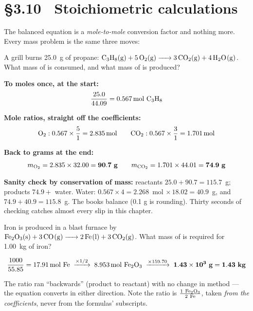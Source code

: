 \documentclass{apchem-worksheet}
\begin{document}
\section*{\sffamily \S3.10 \textbullet\ Stoichiometric calculations}

The balanced equation is a \emph{mole-to-mole} conversion factor and
nothing more. Every mass problem is the same three moves:

\begin{center}
\end{center}

\begin{workedexample}
A grill burns \SI{25.0}{\gram} of propane:
$\ce{C3H8(g) + 5O2(g) -> 3CO2(g) + 4H2O(g)}$.
What mass of  is consumed, and what mass of  is produced?

\textbf{To moles once, at the start:}
\[ \frac{25.0}{44.09} = \SI{0.567}{\mole}~\ce{C3H8} \]

\textbf{Mole ratios, straight off the coefficients:}
\[ \ce{O2}: 0.567 \times \frac{5}{1} = \SI{2.835}{\mole} \qquad
   \ce{CO2}: 0.567 \times \frac{3}{1} = \SI{1.701}{\mole} \]

\textbf{Back to grams at the end:}
\[ m_{\ce{O2}} = 2.835 \times 32.00 = \mathbf{90.7~g} \qquad
   m_{\ce{CO2}} = 1.701 \times 44.01 = \mathbf{74.9~g} \]

\textbf{Sanity check by conservation of mass:} reactants
$25.0 + 90.7 = 115.7$~g; products $74.9 + $ water. Water:
$0.567 \times 4 = 2.268$~mol $\times\, 18.02 = 40.9$~g, and
$74.9 + 40.9 = 115.8$~g. The books balance (0.1 g is rounding). Thirty
seconds of checking catches almost every slip in this chapter.
\end{workedexample}

\begin{workedexample}
Iron is produced in a blast furnace by
$\ce{Fe2O3(s) + 3CO(g) -> 2Fe(l) + 3CO2(g)}$.
What mass of  is required for \SI{1.00}{\kilo\gram} of iron?

\[ \frac{1000}{55.85} = \SI{17.91}{\mole}~\ce{Fe}
   \;\xrightarrow{\times 1/2}\; \SI{8.953}{\mole}~\ce{Fe2O3}
   \;\xrightarrow{\times 159.70}\; \mathbf{1.43\times10^{3}~g}
   = \mathbf{1.43~kg} \]

The ratio ran ``backwards'' (product to reactant) with no change in
method --- the equation converts in either direction. Note the ratio is
$\tfrac{1~\ce{Fe2O3}}{2~\ce{Fe}}$, taken \emph{from the coefficients},
never from the formulas' subscripts.
\end{workedexample}
\end{document}
